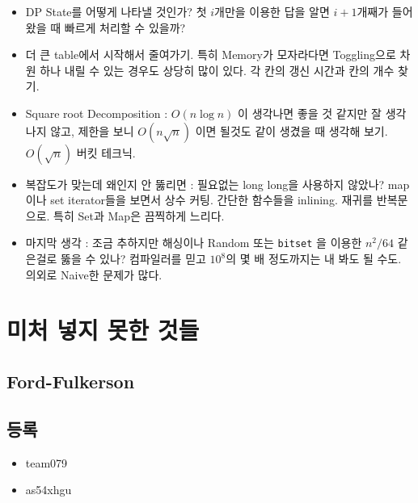 \documentclass[landscape,8pt]{article}
\begin{document}
\begin{multicols}{2}
\begin{itemize}
      \item DP State를 어떻게 나타낼 것인가? 첫 $i$개만을 이용한 답을 알면 $i+1$개째가 들어왔을 때 빠르게 처리할 수 있을까?
      \item 더 큰 table에서 시작해서 줄여가기. 특히 Memory가 모자라다면 Toggling으로 차원 하나 내릴 수 있는 경우도 상당히 많이 있다. 각 칸의 갱신 시간과 칸의 개수 찾기.
      \item Square root Decomposition : $O(n \log n)$ 이 생각나면 좋을 것 같지만 잘 생각나지 않고, 제한을 보니 $O(n \sqrt{n})$ 이면 될것도 같이 생겼을 때 생각해 보기. $O(\sqrt{n})$ 버킷 테크닉.
      \item 복잡도가 맞는데 왜인지 안 뚫리면 : 필요없는 long long을 사용하지 않았나? map이나 set iterator들을 보면서 상수 커팅. 간단한 함수들을 inlining. 재귀를 반복문으로. 특히 Set과 Map은 끔찍하게 느리다.
      \item 마지막 생각 : 조금 추하지만 해싱이나 Random 또는 \texttt{bitset} 을 이용한 $n^2 / 64$ 같은걸로 뚫을 수 있나? 컴파일러를 믿고 $10^8$의 몇 배 정도까지는 내 봐도 될 수도. 의외로 Naive한 문제가 많다.
    \end{itemize}

\newpage
\section*{미처 넣지 못한 것들}
\subsection*{Ford-Fulkerson}

\subsection*{등록}
\begin{itemize}
  \item team079
  \item as54xhgu
\end{itemize}
\end{multicols}
\end{document}

